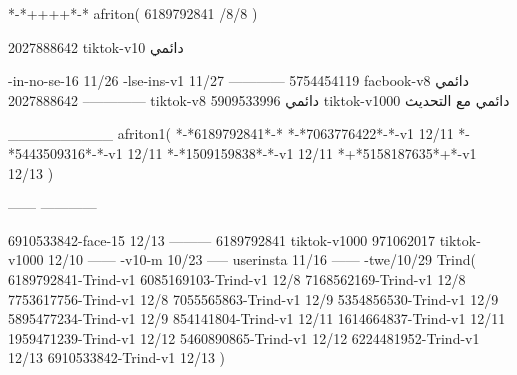 *-*++++*-*
afriton(
6189792841 /8/8
)

2027888642 tiktok-v10
دائمي

-in-no-se-16 11/26
-lse-ins-v1 11/27
------------
5754454119 facbook-v8
دائمي
--------------
2027888642 tiktok-v8
دائمي
5909533996 tiktok-v1000
دائمي مع التحديث

__________
afriton1(
*-*6189792841*-*
*-*7063776422*-*-v1 12/11
*-*5443509316*-*-v1 12/11
*-*1509159838*-*-v1 12/11
*+*5158187635*+*-v1 12/13
)

------
------------


6910533842-face-15 12/13
---------
6189792841 tiktok-v1000
971062017 tiktok-v1000 12/10
------
-v10-m 10/23
-----
userinsta 11/16
------
-twe/10/29
Trind(
6189792841-Trind-v1 
6085169103-Trind-v1 12/8
7168562169-Trind-v1 12/8
7753617756-Trind-v1 12/8
7055565863-Trind-v1 12/9
5354856530-Trind-v1 12/9
5895477234-Trind-v1 12/9
854141804-Trind-v1 12/11
1614664837-Trind-v1 12/11
1959471239-Trind-v1 12/12
5460890865-Trind-v1 12/12
6224481952-Trind-v1 12/13
6910533842-Trind-v1 12/13
)
